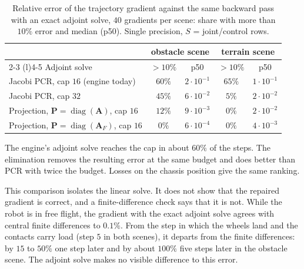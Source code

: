 \begin{table}[h]
  \centering
  \small
  \begin{tabular}{@{}lcccc@{}}
    \toprule
    & \multicolumn{2}{c}{obstacle scene} & \multicolumn{2}{c}{terrain scene} \\
    \cmidrule(lr){2-3} \cmidrule(l){4-5}
    Adjoint solve & $>10\%$ & p50 & $>10\%$ & p50 \\
    \midrule
    Jacobi PCR, cap $16$ (engine today) & $60\%$ & $2 \cdot 10^{-1}$ & $65\%$ & $1 \cdot 10^{-1}$ \\
    Jacobi PCR, cap $32$ & $45\%$ & $6 \cdot 10^{-2}$ & $5\%$ & $2 \cdot 10^{-2}$ \\
    Projection, $\mathbf{P} = \operatorname{diag}(\mathbf{A})$, cap $16$ & $12\%$ & $9 \cdot 10^{-3}$ & $0\%$ & $2 \cdot 10^{-2}$ \\
    Projection, $\mathbf{P} = \operatorname{diag}(\mathbf{A}_F)$, cap $16$ & $0\%$ & $6 \cdot 10^{-4}$ & $0\%$ & $4 \cdot 10^{-3}$ \\
    \bottomrule
  \end{tabular}
  \caption{Relative error of the trajectory gradient against the same
    backward pass with an exact adjoint solve, $40$ gradients per scene:
    share with more than $10\%$ error and median (p50). Single
    precision, $S$ = joint/control rows.}
  \label{tab:adjoint-trajectory}
\end{table}

The engine's adjoint solve reaches the cap in about $60\%$ of the steps.
The elimination removes the resulting error at the same budget and does
better than PCR with twice the budget. Losses on the chassis position
give the same ranking.

This comparison isolates the linear solve. It does not show that the
repaired gradient is correct, and a finite-difference check says that it
is not. While the robot is in free flight, the gradient with the exact
adjoint solve agrees with central finite differences to $0.1\%$. From
the step in which the wheels land and the contacts carry load (step $5$
in both scenes), it departs from the finite differences: by $15$ to
$50\%$ one step later and by about $100\%$ five steps later in the
obstacle scene. The adjoint solve makes no visible difference to this
error.

